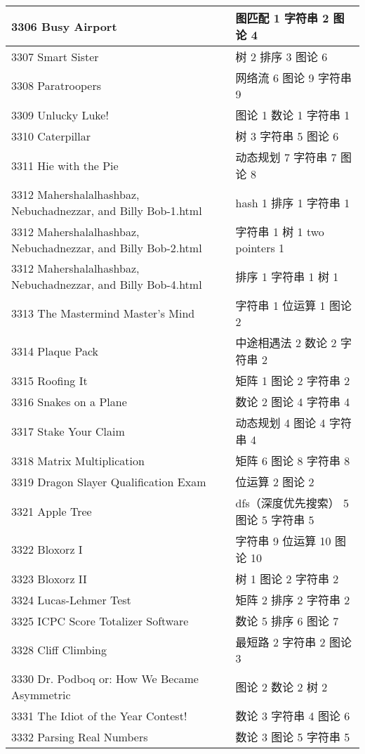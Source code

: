 \begin{longtable}{| p{} | p{} |}
 3306 Busy Airport  & 图匹配 1 字符串 2 图论 4 \\ \hline
 3307 Smart Sister  & 树 2 排序 3 图论 6 \\ \hline
 3308 Paratroopers  & 网络流 6 图论 9 字符串 9 \\ \hline
 3309 Unlucky Luke!  & 图论 1 数论 1 字符串 1 \\ \hline
 3310 Caterpillar  & 树 3 字符串 5 图论 6 \\ \hline
 3311 Hie with the Pie  & 动态规划 7 字符串 7 图论 8 \\ \hline
 3312 Mahershalalhashbaz, Nebuchadnezzar, and Billy Bob-1.html & hash 1 排序 1 字符串 1 \\ \hline
 3312 Mahershalalhashbaz, Nebuchadnezzar, and Billy Bob-2.html & 字符串 1 树 1 two pointers 1 \\ \hline
 3312 Mahershalalhashbaz, Nebuchadnezzar, and Billy Bob-4.html & 排序 1 字符串 1 树 1 \\ \hline
 3313 The Mastermind Master's Mind  & 字符串 1 位运算 1 图论 2 \\ \hline
 3314 Plaque Pack  & 中途相遇法 2 数论 2 字符串 2 \\ \hline
 3315 Roofing It  & 矩阵 1 图论 2 字符串 2 \\ \hline
 3316 Snakes on a Plane  & 数论 2 图论 4 字符串 4 \\ \hline
 3317 Stake Your Claim  & 动态规划 4 图论 4 字符串 4 \\ \hline
 3318 Matrix Multiplication  & 矩阵 6 图论 8 字符串 8 \\ \hline
 3319 Dragon Slayer Qualification Exam  & 位运算 2 图论 2 \\ \hline
 3321 Apple Tree  & dfs（深度优先搜索） 5 图论 5 字符串 5 \\ \hline
 3322 Bloxorz I  & 字符串 9 位运算 10 图论 10 \\ \hline
 3323 Bloxorz II  & 树 1 图论 2 字符串 2 \\ \hline
 3324 Lucas-Lehmer Test  & 矩阵 2 排序 2 字符串 2 \\ \hline
 3325 ICPC Score Totalizer Software  & 数论 5 排序 6 图论 7 \\ \hline
 3328 Cliff Climbing  & 最短路 2 字符串 2 图论 3 \\ \hline
 3330 Dr. Podboq or: How We Became Asymmetric  & 图论 2 数论 2 树 2 \\ \hline
 3331 The Idiot of the Year Contest!  & 数论 3 字符串 4 图论 6 \\ \hline
 3332 Parsing Real Numbers  & 数论 3 图论 5 字符串 5 \\ \hline

\end{longtable}
